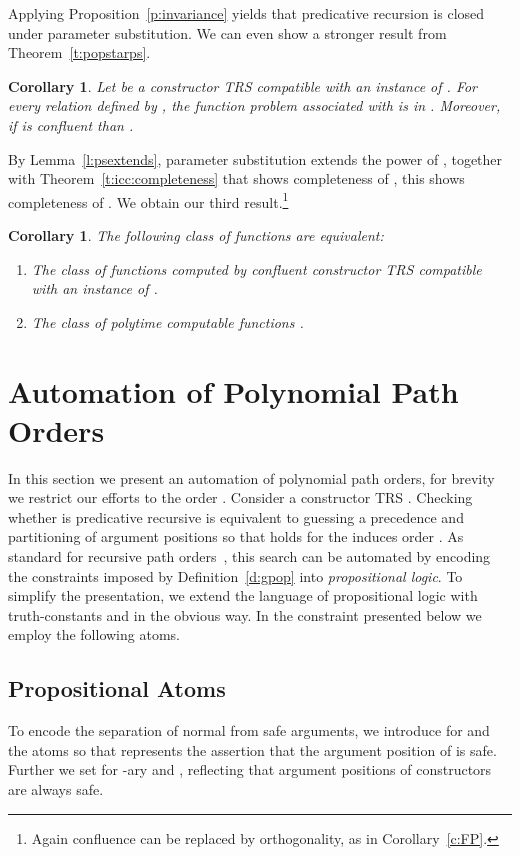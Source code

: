 \documentclass{LMCS}
\newtheorem{corollary}[thm]{Corollary}
\begin{document}
Applying Proposition~\ref{p:invariance} yields that predicative recursion is closed under parameter substitution.
We can even show a stronger result from Theorem~\ref{t:popstarps}.

\begin{corollary}
  Let  be a constructor TRS compatible with an instance of .\@ 
  For every relation  defined by , 
  the function problem  associated with  is in .
  Moreover, if  is confluent than .
\end{corollary}

By Lemma~\ref{l:psextends}, parameter substitution extends the power of , 
together with Theorem~\ref{t:icc:completeness} that shows completeness of , 
this shows completeness of \POPSTARP. We obtain our third result.\footnote{Again confluence can be replaced by orthogonality, as in Corollary~\ref{c:FP}.}
\begin{corollary}\label{c:fptime:ps}
  The following class of functions are equivalent:
  \begin{enumerate}[labelsep=*,leftmargin=*]
  \item The class of functions computed by confluent constructor TRS compatible with an instance of . 
  \item The class of polytime computable functions . 
  \end{enumerate}
\end{corollary}


\section{Automation of Polynomial Path Orders}\label{s:impl}

In this section we present an automation of polynomial path orders,  
for brevity we restrict our efforts to the order .
Consider a constructor TRS . Checking whether  is predicative 
recursive is equivalent to guessing a precedence  and partitioning 
of argument positions so that  holds for the induces
order . 
As standard for recursive path orders~\cite{ZM07,SFTGACMZ07},
this search can be automated by encoding the constraints imposed by Definition~\ref{d:gpop}
into \emph{propositional logic}. 
To simplify the presentation, we extend the language of propositional 
logic with truth-constants  and  in the obvious way.
In the constraint presented below we employ the following atoms. 

\subsection{Propositional Atoms}
To encode the separation of normal from safe arguments, we
introduce for  and  the atoms 
so that  represents the assertion that the \nth{} argument position of  is safe.
Further we set  for -ary  and ,
reflecting that argument positions of constructors are always safe. 
\end{document}
